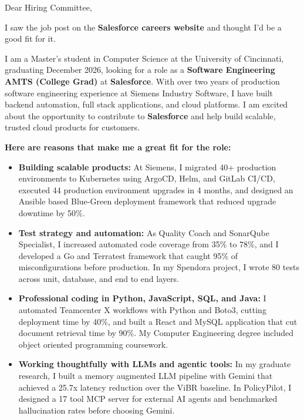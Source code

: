 \documentclass[11pt]{letter}
\date{}
\begin{document}
\begin{letter}{}

\opening{Dear Hiring Committee,}

I saw the job post on the \textbf{Salesforce careers website} and thought I'd be a good fit for it.

I am a Master's student in Computer Science at the University of Cincinnati, graduating December 2026, looking for a role as a \textbf{Software Engineering AMTS (College Grad)} at \textbf{Salesforce}. With over two years of production software engineering experience at Siemens Industry Software, I have built backend automation, full stack applications, and cloud platforms. I am excited about the opportunity to contribute to \textbf{Salesforce} and help build scalable, trusted cloud products for customers.

\textbf{Here are reasons that make me a great fit for the role:}

\begin{itemize}[leftmargin=*, itemsep=0.45em]
    \item \textbf{Building scalable products:} At Siemens, I migrated 40+ production environments to Kubernetes using ArgoCD, Helm, and GitLab CI/CD, executed 44 production environment upgrades in 4 months, and designed an Ansible based Blue-Green deployment framework that reduced upgrade downtime by 50\%.

    \item \textbf{Test strategy and automation:} As Quality Coach and SonarQube Specialist, I increased automated code coverage from 35\% to 78\%, and I developed a Go and Terratest framework that caught 95\% of misconfigurations before production. In my Spendora project, I wrote 80 tests across unit, database, and end to end layers.

    \item \textbf{Professional coding in Python, JavaScript, SQL, and Java:} I automated Teamcenter X workflows with Python and Boto3, cutting deployment time by 40\%, and built a React and MySQL application that cut document retrieval time by 90\%. My Computer Engineering degree included object oriented programming coursework.

    \item \textbf{Working thoughtfully with LLMs and agentic tools:} In my graduate research, I built a memory augmented LLM pipeline with Gemini that achieved a 25.7x latency reduction over the ViBR baseline. In PolicyPilot, I designed a 17 tool MCP server for external AI agents and benchmarked hallucination rates before choosing Gemini.


\end{itemize}
\end{letter}
\end{document}
